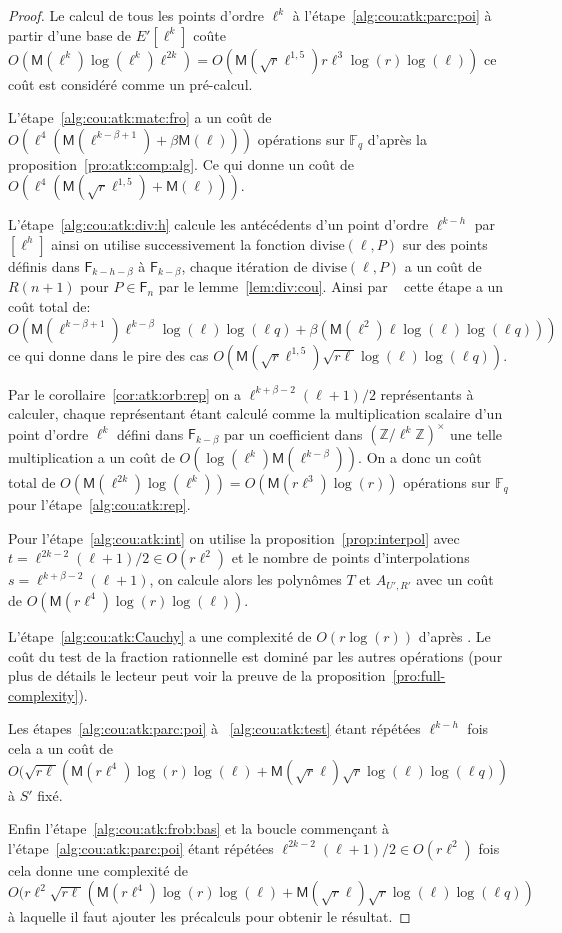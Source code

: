 \documentclass[10pt,a4paper]{book}
\theoremstyle{plain}
\theoremstyle{definition}
\theoremstyle{definition}
\theoremstyle{definition}
\theoremstyle{definition}
\theoremstyle{remark}
\theoremstyle{remark}
\theoremstyle{definition}
\begin{document}
\begin{proof}
Le calcul de tous les points d'ordre $\ell^k$ à 
l'étape~\ref{alg:cou:atk:parc:poi} à partir d'une base de $E'[\ell^k]$ coûte 
$O(\mathsf{M}(\ell^k)\log(\ell^k)\ell^{2k})=
O(\mathsf{M}(\sqrt{r}\ell^{1,5})r\ell^3\log(r)\log(\ell))$ ce coût est considéré comme 
un pré-calcul.

L'étape~\ref{alg:cou:atk:matc:fro} a un coût de 
$O(\ell^4(\mathsf{M}(\ell^{k-\beta+1})+\beta\mathsf{M}(\ell)))$
opérations sur $\mathbb{F}_q$ d'après la proposition~\ref{pro:atk:comp:alg}.
Ce qui donne un coût de $O(\ell^4(\mathsf{M}(\sqrt{r}\ell^{1,5})+\mathsf{M}(\ell)))$.

L'étape~\ref{alg:cou:atk:div:h} calcule les antécédents d'un point d'ordre
$\ell^{k-h}$ par $[\ell^h]$ ainsi on utilise successivement la fonction 
$\mathrm{divise}(\ell,P)$ sur des points définis dans $\mathsf{F}_{k-h-\beta}$ à
$\mathsf{F}_{k-\beta}$, chaque itération de $\mathrm{divise}(\ell,P)$ a un coût
de $R(n+1)$ pour $P \in \mathsf{F}_n$ par le lemme~\ref{lem:div:cou}. Ainsi 
par ~\cite[Chapter~14.5]{vzGJG03} cette étape a un coût total de: 
$O(\mathsf{M}(\ell^{k-\beta +1})\ell^{k-\beta}\log(\ell)\log(\ell q)+\beta (\mathsf{M}(\ell^2)\ell\log(\ell)\log(\ell q)))$ 
ce qui donne dans le pire des cas
$O(\mathsf{M}(\sqrt{r}\ell^{1,5})\sqrt{r\ell}\log(\ell)\log(\ell q))$.

Par le corollaire~\ref{cor:atk:orb:rep} on a $\ell^{k+\beta-2}(\ell+1)/2$ 
représentants à calculer, chaque représentant étant 
calculé comme la multiplication scalaire d'un point d'ordre $\ell^k$ défini 
dans $\mathsf{F}_{k-\beta}$ par un coefficient dans 
$(\mathbb{Z}/\ell^k\mathbb{Z})^{\times}$ une telle multiplication a un coût
de $O(\log(\ell^k)\mathsf{M}(\ell^{k-\beta}))$. On a donc un coût total de 
$O(\mathsf{M}(\ell^{2k})\log(\ell^k))=O(\mathsf{M}(r\ell^3)\log(r))$ opérations sur 
$\mathbb{F}_q$ pour l'étape~\ref{alg:cou:atk:rep}.

Pour l'étape~\ref{alg:cou:atk:int} on utilise la 
proposition~\ref{prop:interpol} avec $t=\ell^{2k-2}(\ell+1)/2 \in O(r\ell^2)$ 
et le nombre de points d'interpolations $s=\ell^{k+\beta-2}(\ell+1)$, on 
calcule alors les polynômes $T$ et $A_{U',R'}$ avec un coût de 
$O(\mathsf{M}(r\ell^4)\log(r)\log(\ell))$. 

L'étape~\ref{alg:cou:atk:Cauchy} a une complexité de $O(r\log(r))$ d'après
\cite[Théorème 7.5]{algeff17}. Le coût du test de la fraction rationnelle est
dominé par les autres opérations (pour plus de détails le lecteur peut voir 
la preuve de la proposition~\ref{pro:full-complexity}).

Les étapes~\ref{alg:cou:atk:parc:poi} à ~\ref{alg:cou:atk:test} étant répétées 
$\ell^{k-h}$ fois cela a un coût de 
$O(\sqrt{r \ell}(\mathsf{M}(r\ell^4)\log(r)\log(\ell)+\mathsf{M}(\sqrt{r}\ell)\sqrt{r}\log(\ell)\log(\ell q))$ 
à $S'$ fixé.

Enfin l'étape~\ref{alg:cou:atk:frob:bas} et la boucle commençant à 
l'étape~\ref{alg:cou:atk:parc:poi} étant répétées $\ell^{2k-2}(\ell+1)/2 \in 
O(r\ell^2)$ fois cela donne une complexité de $O(r \ell^2 \sqrt{r \ell}(\mathsf{M}(r\ell^4)\log(r)\log(\ell)+\mathsf{M}(\sqrt{r}\ell)\sqrt{r}\log(\ell)\log(\ell q))$ à laquelle il faut ajouter les précalculs pour obtenir 
le résultat.
\end{proof}
\end{document}
